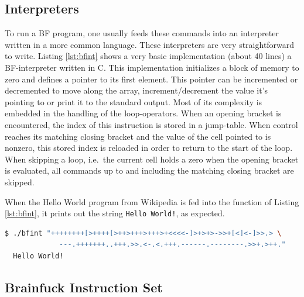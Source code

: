 \subsection{Interpreters}
To run a BF program, one usually feeds these commands into an interpreter written in a more common language. These interpreters are very straightforward to write. Listing \ref{lst:bfint} shows a very basic implementation (about 40 lines) a BF-interpreter written in C. This implementation initializes a block of memory to zero and defines a pointer to its first element. This pointer can be incremented or decremented to move along the array, increment/decrement the value it's pointing to or print it to the standard output. Most of its complexity is embedded in the handling of the loop-operators. When an opening bracket is encountered, the index of this instruction is stored in a jump-table. When control reaches its matching closing bracket and the value of the cell pointed to is nonzero, this stored index is reloaded in order to return to the start of the loop. When skipping a loop, i.e.~the current cell holds a zero when the opening bracket is evaluated, all commands up to and including the matching closing bracket are skipped.

\begin{lstfloat}[H]
    
\caption{Very basic implementation of a BF interpreter in C.}
\label{lst:bfint}
\end{lstfloat}

When the Hello World program from Wikipedia \cite{bfwiki} is fed into the function of Listing \ref{lst:bfint}, it prints out the string \texttt{Hello World!}, as expected.
\vspace{0.5cm}
\begin{lstlisting}[language=bash]
  $ ./bfint "++++++++[>++++[>++>+++>+++>+<<<<-]>+>+>->>+[<]<-]>>.> \
             ---.+++++++..+++.>>.<-.<.+++.------.--------.>>+.>++."
  Hello World!
\end{lstlisting}


\subsection{Brainfuck Instruction Set}
